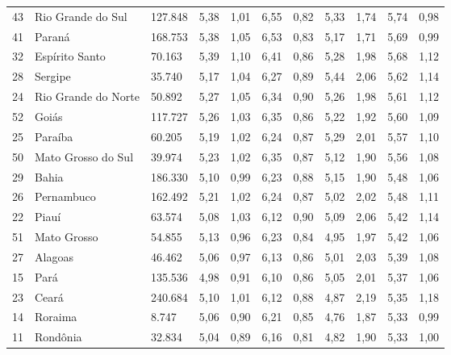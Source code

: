 \begin{table}[]
\begin{tabular}{lllllllllll}
        \rowcolor[HTML]{DCE6F1}
        43 & Rio Grande do Sul   & 127.848 & 5,38 & 1,01 & 6,55 & 0,82 & 5,33 & 1,74 & 5,74 & 0,98 \\
        41 & Paraná              & 168.753 & 5,38 & 1,05 & 6,53 & 0,83 & 5,17 & 1,71 & 5,69 & 0,99 \\
        \rowcolor[HTML]{DCE6F1}
        32 & Espírito Santo      & 70.163  & 5,39 & 1,10 & 6,41 & 0,86 & 5,28 & 1,98 & 5,68 & 1,12 \\
        28 & Sergipe             & 35.740  & 5,17 & 1,04 & 6,27 & 0,89 & 5,44 & 2,06 & 5,62 & 1,14 \\
        \rowcolor[HTML]{DCE6F1}
        24 & Rio Grande do Norte & 50.892  & 5,27 & 1,05 & 6,34 & 0,90 & 5,26 & 1,98 & 5,61 & 1,12 \\
        52 & Goiás               & 117.727 & 5,26 & 1,03 & 6,35 & 0,86 & 5,22 & 1,92 & 5,60 & 1,09 \\
        \rowcolor[HTML]{DCE6F1}
        25 & Paraíba             & 60.205  & 5,19 & 1,02 & 6,24 & 0,87 & 5,29 & 2,01 & 5,57 & 1,10 \\
        50 & Mato Grosso do Sul  & 39.974  & 5,23 & 1,02 & 6,35 & 0,87 & 5,12 & 1,90 & 5,56 & 1,08 \\
        \rowcolor[HTML]{DCE6F1}
        29 & Bahia               & 186.330 & 5,10 & 0,99 & 6,23 & 0,88 & 5,15 & 1,90 & 5,48 & 1,06 \\
        26 & Pernambuco          & 162.492 & 5,21 & 1,02 & 6,24 & 0,87 & 5,02 & 2,02 & 5,48 & 1,11 \\
        \rowcolor[HTML]{DCE6F1}
        22 & Piauí               & 63.574  & 5,08 & 1,03 & 6,12 & 0,90 & 5,09 & 2,06 & 5,42 & 1,14 \\
        51 & Mato Grosso         & 54.855  & 5,13 & 0,96 & 6,23 & 0,84 & 4,95 & 1,97 & 5,42 & 1,06 \\
        \rowcolor[HTML]{DCE6F1}
        27 & Alagoas             & 46.462  & 5,06 & 0,97 & 6,13 & 0,86 & 5,01 & 2,03 & 5,39 & 1,08 \\
        15 & Pará                & 135.536 & 4,98 & 0,91 & 6,10 & 0,86 & 5,05 & 2,01 & 5,37 & 1,06 \\
        \rowcolor[HTML]{DCE6F1}
        23 & Ceará               & 240.684 & 5,10 & 1,01 & 6,12 & 0,88 & 4,87 & 2,19 & 5,35 & 1,18 \\
        14 & Roraima             & 8.747   & 5,06 & 0,90 & 6,21 & 0,85 & 4,76 & 1,87 & 5,33 & 0,99 \\
        \rowcolor[HTML]{DCE6F1}
        11 & Rondônia            & 32.834  & 5,04 & 0,89 & 6,16 & 0,81 & 4,82 & 1,90 & 5,33 & 1,00 \\

\end{tabular}
\end{table}

